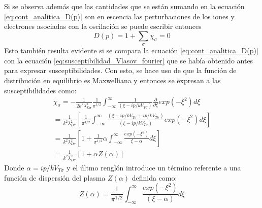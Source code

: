 \documentclass[../tesis_main_file.tex]{subfiles}
\begin{document}
Si se observa además que las cantidades que se están sumando en la ecuación \ref{eq:cont_analitica_D(p)} son en escencia las perturbaciones de los iones y electrones asociadas con la oscilación se puede escribir entonces
\begin{equation}
\label{eq:D(p)_como_suma_de_susceptibilidades}
D(p)=1 + \sum_{\sigma}\chi_{\sigma}=0
\end{equation}
Esto también resulta evidente si se compara la ecuación \ref{eq:cont_analitica_D(p)} con la ecuación \ref{eq:susceptibilidad_Vlasov_fourier} que se había obtenido antes para expresar susceptibilidades. Con esto, se hace uso de que la función de distribución en equilibrio es Maxwelliana y entonces se expresan a las susceptibilidades como:
\begin{multline}
\label{eq:susceptibilidad_Landau}
\chi_{\sigma} = -\frac{1}{2k^2 \lambda ^2_{D\sigma}}\frac{1}{\pi^{1/2}}\int ^{\infty}_{-\infty}\frac{1}{(\xi - ip/kV_{T\sigma})}\frac{\partial}{\partial \xi}exp(-\xi ^2)d\xi\\
= \frac{1}{k^2 \lambda ^2_{D\sigma}}\left[ \frac{1}{\pi ^{1/2}}\int ^{\infty}_{-\infty} \frac{(\xi - ip/kV_{T\sigma}+ ip/kV_{T\sigma})}{(\xi - ip/kV_{T\sigma})}exp(-\xi ^2)d\xi\right]\\
=\frac{1}{k^2 \lambda ^2_{D\sigma}}\left[1 + \frac{1}{\pi ^{1/2}}\alpha\int^{\infty}_{-\infty}\frac{exp(-\xi ^2)}{\xi -\alpha}d\xi\right]\\
= \frac{1}{k^2 \lambda ^2_{D\sigma}}\left[1+\alpha Z(\alpha)\right]
\end{multline}
Donde $\alpha = ip/kV_{T\sigma}$ y el últmo renglón introduce un término referente a una función de dispersión del plasma $Z(\alpha)$ definida como:
\begin{equation}
\label{eq:Z_dispersion_plasma}
Z(\alpha) =\frac{1}{\pi ^{1/2}}\int^{\infty}_{-\infty}\frac{exp(-\xi ^2)}{(\xi- \alpha)}d\xi
\end{equation}
\end{document}
